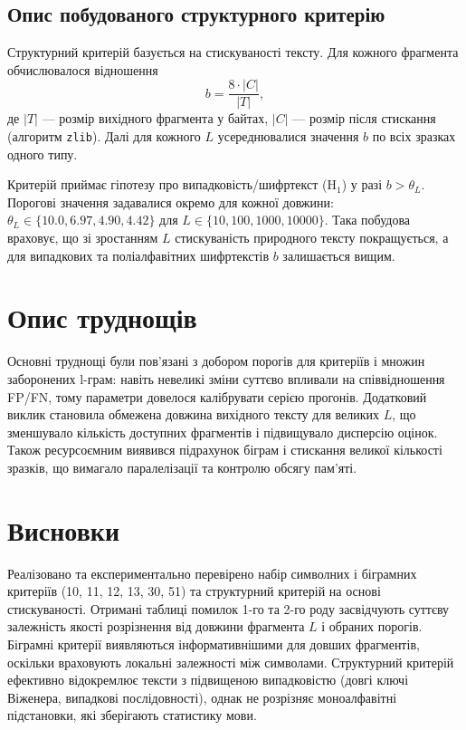 \documentclass{article}
\begin{document}
\subsection{Опис побудованого структурного критерію}

Структурний критерій базується на стискуваності тексту. Для кожного фрагмента обчислювалося відношення
\[
 b = \frac{8\cdot |C|}{|T|},
\]
де \(|T|\) --- розмір вихідного фрагмента у байтах, \(|C|\) --- розмір після стискання (алгоритм \texttt{zlib}). Далі для кожного \(L\) усереднювалися значення \(b\) по всіх зразках одного типу.

Критерій приймає гіпотезу про випадковість/шифртекст (H\(_1\)) у разі \(b>\theta_{L}\). Порогові значення задавалися окремо для кожної довжини: \(\theta_{L}\in\{10.0, 6.97, 4.90, 4.42\}\) для \(L\in\{10,100,1000,10000\}\). Така побудова враховує, що зі зростанням \(L\) стискуваність природного тексту покращується, а для випадкових та поліалфавітних шифртекстів \(b\) залишається вищим.

\section{Опис труднощів}

Основні труднощі були пов'язані з добором порогів для критеріїв і множин заборонених l-грам: навіть невеликі зміни суттєво впливали на співвідношення FP/FN, тому параметри довелося калібрувати серією прогонів. Додатковий виклик становила обмежена довжина вихідного тексту для великих \(L\), що зменшувало кількість доступних фрагментів і підвищувало дисперсію оцінок. Також ресурсоємним виявився підрахунок біграм і стискання великої кількості зразків, що вимагало паралелізації та контролю обсягу пам'яті.

\section{Висновки}

Реалізовано та експериментально перевірено набір символних і біграмних критеріїв (10, 11, 12, 13, 30, 51) та структурний критерій на основі стискуваності. Отримані таблиці помилок 1-го та 2-го роду засвідчують суттєву залежність якості розрізнення від довжини фрагмента \(L\) і обраних порогів. Біграмні критерії виявляються інформативнішими для довших фрагментів, оскільки враховують локальні залежності між символами. Структурний критерій ефективно відокремлює тексти з підвищеною випадковістю (довгі ключі Віженера, випадкові послідовності), однак не розрізняє моноалфавітні підстановки, які зберігають статистику мови.
\end{document}
